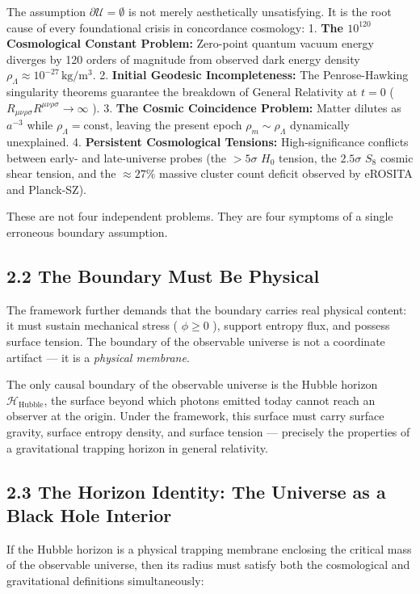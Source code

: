 \documentclass[11pt,a4paper]{article}
\theoremstyle{definition}\newtheorem{definition}{Definition}
\theoremstyle{remark}\newtheorem{remark}{Remark}
\begin{document}
The assumption $\partial\mathcal{U} = \emptyset$ is not merely aesthetically unsatisfying. It is the root cause of every foundational crisis in concordance cosmology:
1. \textbf{The $10^{120}$ Cosmological Constant Problem:} Zero-point quantum vacuum energy diverges by 120 orders of magnitude from observed dark energy density $\rho_\Lambda \approx 10^{-27} \, \mathrm{kg/m^3}$.
2. \textbf{Initial Geodesic Incompleteness:} The Penrose-Hawking singularity theorems guarantee the breakdown of General Relativity at $t = 0$ ( $R_{\mu\nu\rho\sigma}R^{\mu\nu\rho\sigma} \to \infty$ ).
3. \textbf{The Cosmic Coincidence Problem:} Matter dilutes as $a^{-3}$ while $\rho_\Lambda = \text{const}$, leaving the present epoch $\rho_m \sim \rho_\Lambda$ dynamically unexplained.
4. \textbf{Persistent Cosmological Tensions:} High-significance conflicts between early- and late-universe probes (the $> 5\sigma$ $H_0$ tension, the $2.5\sigma$ $S_8$ cosmic shear tension, and the $\approx 27\%$ massive cluster count deficit observed by eROSITA and Planck-SZ).

These are not four independent problems. They are four symptoms of a single erroneous boundary assumption.
\subsection{2.2 The Boundary Must Be Physical}

The framework further demands that the boundary carries real physical content: it must sustain mechanical stress ( $\phi \ge 0$ ), support entropy flux, and possess surface tension. The boundary of the observable universe is not a coordinate artifact — it is a \textit{physical membrane}.

The only causal boundary of the observable universe is the Hubble horizon $\mathcal{H}_{\text{Hubble}}$, the surface beyond which photons emitted today cannot reach an observer at the origin. Under the framework, this surface must carry surface gravity, surface entropy density, and surface tension — precisely the properties of a gravitational trapping horizon in general relativity.
\subsection{2.3 The Horizon Identity: The Universe as a Black Hole Interior}

If the Hubble horizon is a physical trapping membrane enclosing the critical mass of the observable universe, then its radius must satisfy both the cosmological and gravitational definitions simultaneously:
\end{document}
